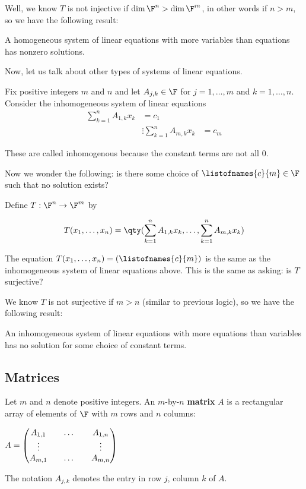 Well, we know $T$ is not injective if $\dim \F^n > \dim \F^m$, in other words
if $n > m$, so we have the following result:

\begin{theorem} 
   A homogeneous system of linear equations with more
   variables than equations has nonzero solutions.
\end{theorem}

Now, let us talk about other types of systems of linear equations.

\begin{definition} 
   Fix positive integers $m$ and $n$ and let $A_{j, k} \in \F$ for
   $j = 1, \dots, m$ and $k = 1, \dots, n$. Consider
   the inhomogeneous system of linear equations
   \begin{align*}
      \sum_{k=1}^n A_{1,k}x_k &= c_1 \\
      &\vdots
      \sum_{k=1}^n A_{m,k}x_k &= c_m
   \end{align*}

   These are called inhomogenous because the constant terms are
   not all 0.
\end{definition}

Now we wonder the following:
is there some choice of $\listofnames{c}{m} \in \F$ such that
no solution exists?

Define $T: \F^n \to \F^m$ by

\[ T(x_1, \dots, x_n) = \qty(\sum_{k=1}^n A_{1,k}x_k, \dots, \sum_{k=1}^n A_{m, k}x_k) \]

The equation $T(x_1, \dots, x_n) = (\listofnames{c}{m})$ is the same
as the inhomogeneous system of linear equations above. This is the same
as asking: is $T$ surjective?

We know $T$ is not surjective if $m > n$ (similar to previous logic),
so we have the following result:

\begin{theorem} 
   An inhomogeneous system of linear equations with more equations
   than variables has no solution for some choice of
   constant terms.
\end{theorem}

\subsection{Matrices}

\begin{definition} [Matrix]
   Let $m$ and $n$ denote positive integers. An $m$-by-$n$ \textbf{matrix}
   $A$ is a rectangular array of elements of $\F$ with $m$ rows and $n$ columns:

   $A = \begin{pmatrix}
     A_{1,1} && \dots && A_{1,n} \\
     \vdots && \empty && \vdots \\
     A_{m,1} && \dots && A_{m,n} 
   \end{pmatrix}$

   The notation $A_{j,k}$ denotes the entry in row $j$, column $k$ of $A$.
\end{definition}

